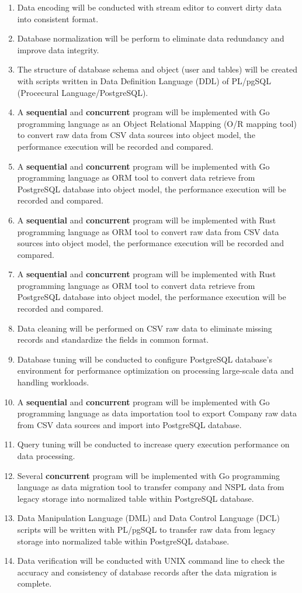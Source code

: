 \begin{enumerate}[topsep=0pt,itemsep=-1ex,partopsep=1ex,parsep=1.5ex]
	
	\item Data encoding will be conducted with stream editor to convert dirty data into consistent format.
	\item Database normalization will be perform to eliminate data redundancy and improve data integrity.
	\item The structure of database schema and object (user and tables) will be created with scripts written in Data Definition Language (DDL) of PL/pgSQL (Procecural Language/PostgreSQL). 
	\item A \textbf{sequential} and \textbf{concurrent} program will be implemented with Go programming language as an Object Relational Mapping (O/R mapping tool) to convert raw data from CSV data sources into object model, the performance execution will be recorded and compared. 
	\item A \textbf{sequential} and \textbf{concurrent} program will be implemented with Go programming language as ORM tool to convert data retrieve from PostgreSQL database into object model, the performance execution will be recorded and compared.  
	\item A \textbf{sequential} and \textbf{concurrent} program will be implemented with Rust programming language as ORM tool to convert raw data from CSV data sources into object model, the performance execution will be recorded and compared. 
	\item A \textbf{sequential} and \textbf{concurrent} program will be implemented with Rust programming language as ORM tool to convert data retrieve from PostgreSQL database into object model, the performance execution will be recorded and compared.
	\item Data cleaning will be performed on CSV raw data to eliminate missing records and standardize the fields in common format. 
	\item Database tuning will be conducted to configure PostgreSQL database's environment for performance optimization on processing large-scale data and handling workloads. 
	\item A \textbf{sequential} and \textbf{concurrent} program will be implemented with Go programming language as data importation tool to export Company raw data from CSV data sources and import into PostgreSQL database. 
	\item Query tuning will be conducted to increase query execution performance on data processing. 
	\item Several \textbf{concurrent} program will be implemented with Go programming language as data migration tool to transfer company and NSPL data from legacy storage into normalized table within PostgreSQL database. 
	\item Data Manipulation Language (DML) and Data Control Language (DCL) scripts will be written with PL/pgSQL to transfer raw data from legacy storage into normalized table within PostgreSQL database.  
	\item Data verification will be conducted with UNIX command line to check the accuracy and consistency of database records after the data migration is complete. 
	

\end{enumerate}
